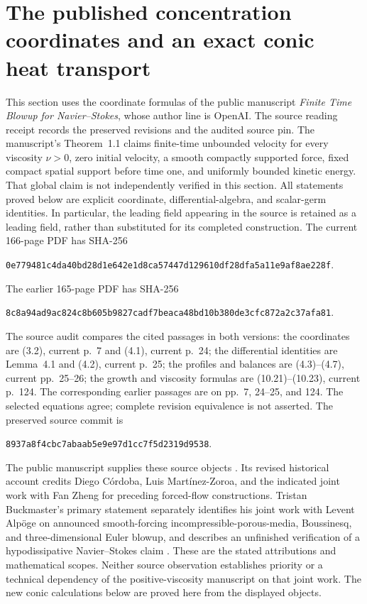 \section{The published concentration coordinates and an exact conic heat transport}
\label{sec:ns-conic-transport}

This section uses the coordinate formulas of the public manuscript
\emph{Finite Time Blowup for Navier--Stokes}, whose author line is
OpenAI. The source reading receipt records the preserved revisions and
the audited source pin. The manuscript's Theorem~1.1 claims finite-time
unbounded velocity for every viscosity $\nu>0$, zero initial velocity,
a smooth compactly supported force, fixed compact spatial support before
time one, and uniformly bounded kinetic energy. That global claim is
not independently verified in this section. All statements proved below
are explicit coordinate, differential-algebra, and scalar-germ identities.
In particular, the leading field appearing in the source is retained as
a leading field, rather than substituted for its completed construction.
The current 166-page PDF has SHA-256
\begin{center}\small\texttt{0e779481c4da40bd28d1e642e1d8ca57447d129610df28dfa5a11e9af8ae228f}.\end{center}
The earlier 165-page PDF has SHA-256
\begin{center}\small\texttt{8c8a94ad9ac824c8b605b9827cadf7beaca48bd10b380de3cfc872a2c37afa81}.\end{center}
The source audit compares the cited passages in both versions: the
coordinates are (3.2), current p.~7 and (4.1), current p.~24;
the differential identities are Lemma~4.1 and (4.2), current p.~25;
the profiles and balances are (4.3)--(4.7), current pp.~25--26;
the growth and viscosity formulas are (10.21)--(10.23), current
p.~124. The corresponding earlier passages are on pp.~7, 24--25,
and 124. The selected equations agree; complete revision equivalence
is not asserted. The preserved source commit is
\begin{center}\small\texttt{8937a8f4cbc7abaab5e9e97d1cc7f5d2319d9538}.\end{center}
The public manuscript supplies these source objects
\cite{OpenAINSBridge2026}. Its revised historical account credits
Diego C\'ordoba, Luis Mart\'inez-Zoroa, and the indicated joint work
with Fan Zheng for preceding forced-flow constructions.
Tristan Buckmaster's primary statement separately identifies his
joint work with Levent Alp\"oge on announced smooth-forcing
incompressible-porous-media, Boussinesq, and three-dimensional Euler
blowup, and describes an unfinished verification of a hypodissipative
Navier--Stokes claim \cite{BuckmasterStatementBridge2026}.
These are the stated attributions and mathematical scopes. Neither
source observation establishes priority or a technical dependency
of the positive-viscosity manuscript on that joint work. The new
conic calculations below are proved here from the displayed objects.


